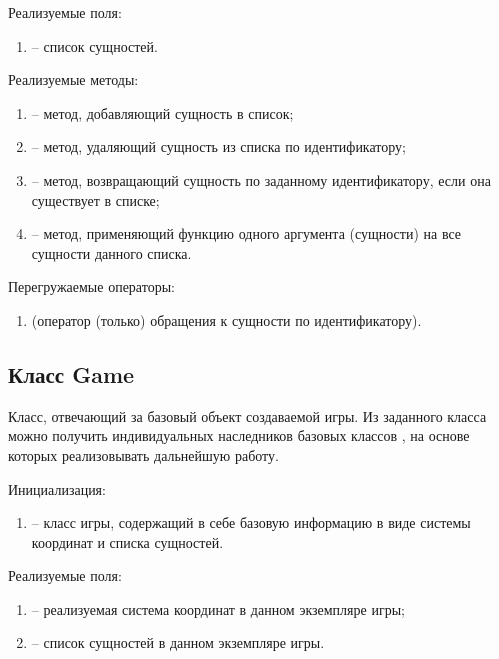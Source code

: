 	\noindent Реализуемые поля:
	\begin{enumerate}
		\item {} -- список сущностей.
	\end{enumerate}

	\noindent Реализуемые методы:
	\begin{enumerate}
		\item {} -- метод, добавляющий сущность в список;
		\item {} -- метод, удаляющий сущность из списка по идентификатору;
		\item {} -- метод, возвращающий сущность по заданному идентификатору, если она существует в списке;
		\item {} -- метод, применяющий функцию одного аргумента (сущности) на все сущности данного списка.
	\end{enumerate}

	\noindent Перегружаемые операторы:
	\begin{enumerate}
		\item {} (оператор (только) обращения к сущности по идентификатору).
	\end{enumerate}


\subsection{Класс Game}
	\noindent Класс, отвечающий за базовый объект создаваемой игры. Из заданного класса можно получить индивидуальных наследников базовых классов , на основе которых реализовывать дальнейшую работу.

	\noindent Инициализация:
	\begin{enumerate}
		\item {} -- класс игры, содержащий в себе базовую информацию в виде системы координат и списка сущностей.
	\end{enumerate}

	\noindent Реализуемые поля:
	\begin{enumerate}
		\item {} -- реализуемая система координат в данном экземпляре игры;
		\item {} -- список сущностей в данном экземпляре игры.
	\end{enumerate}

